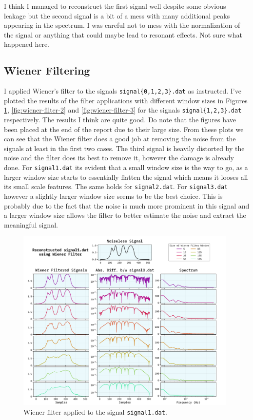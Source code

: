 \documentclass[10pt, titlepage, a4paper]{article}
\begin{document}
I think I managed to reconstruct the first signal well despite some obvious leakage but the second signal is a bit of a mess 
with many additional peaks appearing in the spectrum. I was careful not to mess with the normalization of the signal or anything
that could maybe lead to resonant effects. Not sure what happened here. \\

\subsection{Wiener Filtering}
I applied Wiener's filter to the signals \texttt{signal\{0,1,2,3\}.dat} as instructed. I've plotted the results of the filter 
applications with different window sizes in Figures \ref{fig:wiener-filter-1}, \ref{fig:wiener-filter-2} and 
\ref{fig:wiener-filter-3} for the signals \texttt{signal\{1,2,3\}.dat} respectively. The results I think are quite good. Do note 
that the figures have been placed at the end of the report due to their large size.
From these plots we can see that the Wiener filter does a good job at removing the noise from the signals at least in the first two 
cases. The third signal is heavily distorted by the noise and the filter does its best to remove it, however the damage 
is already done. For \texttt{signal1.dat} its evident that a small window size is the way to go, as a larger window size 
starts to essentially flatten the signal which means it looses all its small scale features. The same holds for \texttt{signal2.dat}.
For \texttt{signal3.dat} however a slightly larger window size seems to be the best choice. This is probably due to the fact that
the noise is much more prominent in this signal and a larger window size allows the filter to better estimate the noise and 
extract the meaningful signal. \\

\begin{figure}[p]
    \centering
    \includegraphics[width=0.98\textwidth]{../WienerFilter/Images/reconstructed-signal1.dat.png}
    \caption{Wiener filter applied to the signal \texttt{signal1.dat}.}
    \label{fig:wiener-filter-1}
\end{figure}
\end{document}
